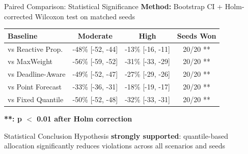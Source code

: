 \documentclass[aspectratio=169]{beamer}
\begin{document}
\begin{frame}{Paired Comparison: Statistical Significance}
\textbf{Method:} Bootstrap CI + Holm-corrected Wilcoxon test on matched seeds

\begin{table}
\small
\begin{tabular}{lccc}
\toprule
\textbf{Baseline} & \textbf{Moderate} & \textbf{High} & \textbf{Seeds Won} \\
\midrule
vs Reactive Prop. & -48\% [-52, -44] & -13\% [-16, -11] & 20/20 ** \\
vs MaxWeight & -56\% [-59, -52] & -31\% [-33, -29] & 20/20 ** \\
vs Deadline-Aware & -49\% [-52, -47] & -27\% [-29, -26] & 20/20 ** \\
vs Point Forecast & -33\% [-36, -31] & -18\% [-19, -17] & 20/20 ** \\
vs Fixed Quantile & -50\% [-52, -48] & -32\% [-33, -31] & 20/20 ** \\
\bottomrule
\end{tabular}
\end{table}

\textbf{**: p $<$ 0.01 after Holm correction}

\begin{alertblock}{Statistical Conclusion}
Hypothesis \textbf{strongly supported}: quantile-based allocation significantly reduces violations across all scenarios and seeds
\end{alertblock}
\end{frame}
\end{document}
